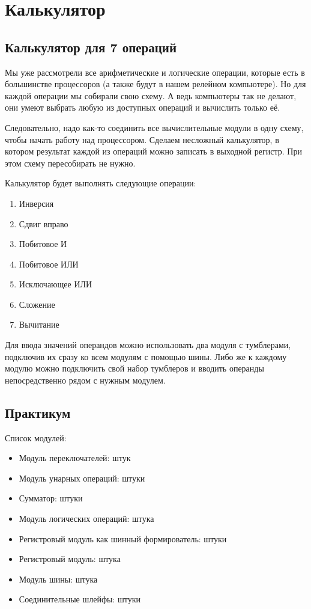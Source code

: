 \chapter{Калькулятор}

\section{Калькулятор для 7 операций}

Мы уже рассмотрели все арифметические и логические операции, которые
есть в большинстве процессоров (а также будут в нашем релейном компьютере).
Но для каждой операции мы собирали свою схему. А ведь компьютеры так не делают,
они умеют выбрать любую из доступных операций и вычислить только её.

Следовательно, надо как-то соединить все вычислительные модули
в одну схему, чтобы начать работу над процессором.
Сделаем несложный калькулятор, в котором результат каждой из операций можно
записать в выходной регистр. При этом схему пересобирать не нужно.

Калькулятор будет выполнять следующие операции:
\begin{enumerate}
    \item Инверсия
    \item Сдвиг вправо
    \item Побитовое И
    \item Побитовое ИЛИ
    \item Исключающее ИЛИ
    \item Сложение
    \item Вычитание
\end{enumerate}

Для ввода значений операндов можно использовать два модуля с тумблерами, подключив их
сразу ко всем модулям с помощью шины. Либо же к каждому модулю можно подключить
свой набор тумблеров и вводить операнды непосредственно рядом с нужным модулем.

\section{Практикум}

Список модулей:
\begin{itemize}
    \item Модуль переключателей:  штук
    \item Модуль унарных операций:  штуки
    \item Сумматор:  штуки
    \item Модуль логических операций:  штука
    \item Регистровый модуль как шинный формирователь:  штуки
    \item Регистровый модуль:  штука
    \item Модуль шины:  штука
    \item Соединительные шлейфы:  штуки
\end{itemize}

